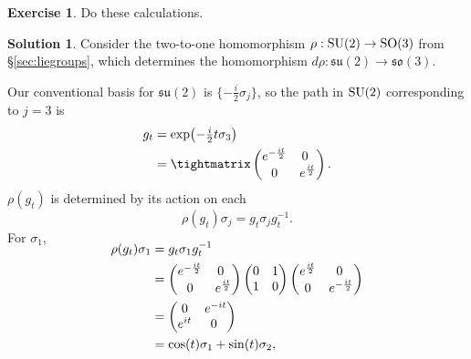 \documentclass[11pt, a4paper]{report}
\theoremstyle{definition}
\newtheorem{exercise}{Exercise}[part]
\newtheorem{solution}{Solution}[part]
\newenvironment{ex}{\begin{exercise}}{\end{exercise}\pagebreak[1]}
\newenvironment{sol}{\begin{solution}}{\end{solution}\pagebreak[3]}
\newcommand*{\SO}{\ensuremath\text{SO}}
\newcommand*{\SU}{\ensuremath\text{SU}}
\begin{document}
\begin{ex}

Do these calculations.

\end{ex}

\begin{sol}

Consider the two-to-one homomorphism $\rho: \SU(2) \to \SO(3)$ from \S\ref{sec:liegroups}, which determines the homomorphism $d\rho: \mathfrak{su}(2) \to \mathfrak{so}(3)$.

Our conventional basis for $\mathfrak{su}(2)$ is $\{-\frac{i}{2} \sigma_j\}$, so the path in $\SU(2)$ corresponding to $j = 3$ is
\begin{align*}
    g_t &= \exp\bigl(-\tfrac{i}{2} t \sigma_3\bigr) \\
        &= \tightmatrix\begin{pmatrix}
                e^{-\frac{it}{2}} & 0 \;\, \\
                0                 & e^{\frac{it}{2}}
            \end{pmatrix}.
\end{align*}
$\rho(g_t)$ is determined by its action on each
\[
    \rho(g_t) \sigma_j = g_t \sigma_j g_t^{-1}.
\]
For $\sigma_1$,
\begin{align*}
    \SwapAboveDisplaySkip
    \rho(g_t) \sigma_1 &= g_t \sigma_1 g_t^{-1} \\
        &= \begin{pmatrix}
                e^{-\frac{it}{2}} & 0 \;\, \\
                0                 & e^{\frac{it}{2}}
            \end{pmatrix}
            \begin{pmatrix}
                0 & 1 \\
                1 & 0
            \end{pmatrix}
            \begin{pmatrix}
                e^{\frac{it}{2}} & 0 \; \\
                0                & e^{- \frac{it}{2}}
            \end{pmatrix} \\
        &= \begin{pmatrix}
                0      & e^{-it} \\
                e^{it} & 0 \;
            \end{pmatrix} \\
        &= \cos(t) \sigma_1 + \sin(t) \sigma_2,
\end{align*}

\end{sol}
\end{document}
